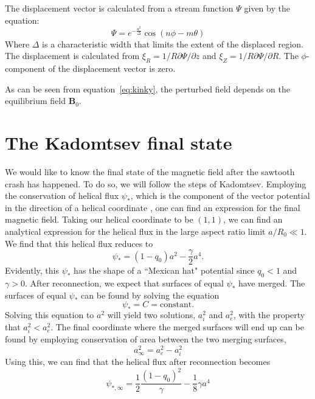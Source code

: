 \documentclass[%
superscriptaddress,
amsmath,amssymb,
aps,
pre,
floatfix,
]{revtex4-2}
\begin{document}
The displacement vector is calculated from a stream function $\Psi$ given by the equation: 
\begin{equation}
    \Psi = e^{-\frac{a^2}{\Delta}}\cos(n \phi - m \theta)
\end{equation}
Where $\Delta$ is a characteristic width that limits the extent of the displaced region. 
The displacement is calculated from $\xi_R= 1/R \partial \Psi/\partial z$ and $\xi_Z= 1/R \partial \Psi/\partial R$. 
The $\phi$-component of the displacement vector is zero. 

As can be seen from equation~\eqref{eq:kinky}, the perturbed field depends on the equilibrium field $\mathbf{B}_0$. 



\section*{The Kadomtsev final state}
We would like to know the final state of the magnetic field after the sawtooth crash has happened. To do so, we will follow the steps of Kadomtsev. Employing the conservation of helical flux $\psi_*$, which is the component of the vector potential in the direction of a helical coordinate \cite{Biskamp1997}, one can find an expression for the final magnetic field. Taking our helical coordinate to be $(1,1)$, we can find an analytical expression for the helical flux in the large aspect ratio limit $a/R_0 \ll 1$. We find that this helical flux reduces to
\begin{equation}
    \psi_{*} = (1-q_0)a^2 - \frac{\gamma}{2}a^4.
\end{equation}
Evidently, this $\psi_*$ has the shape of a ``Mexican hat" potential since $q_0<1$ and $\gamma>0$. After reconnection, we expect that surfaces of equal $\psi_*$ have merged. The surfaces of equal $\psi_*$ can be found by solving the equation
\begin{equation}
    \psi_{*} = C = \text{constant.}
\end{equation}
Solving this equation to $a^2$ will yield two solutions, $a_i^2$ and $a_e^2$, with the property that $a_i^2 < a_e^2$. The final coordinate where the merged surfaces will end up can be found by employing conservation of area between the two merging surfaces,
\begin{equation}
    a_{\infty}^2 = a_e^2 - a_i^2
\end{equation}
Using this, we can find that the helical flux after reconnection becomes
\begin{equation}
    \psi_{*,\infty} = \frac{1}{2}\frac{(1-q_0)^2}{\gamma} - \frac{1}{8} \gamma a^4
    \label{eq:final-helical-flux}
\end{equation}
\end{document}
